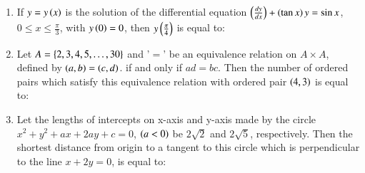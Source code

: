 \documentclass[journal,12pt,onecolumn]{IEEEtran}
\theoremstyle{remark}
\begin{document}
\begin{enumerate}
\hfill{}
\begin{enumerate}
\end{enumerate}

\item If $y=y\left(x\right)$ is the solution of the differential equation $\left(\frac{dy}{dx}\right)+\left(\tan x\right)y=\sin x$, $0\leq x\leq \frac{\pi}{3}$, with $y\left(0\right)=0$, then $y\left(\frac{\pi}{4}\right)$ is equal to:

\hfill{}
\begin{enumerate}
\end{enumerate}

\item Let $A=\left\{2,3,4,5,\dots,30\right\}$ and '$=$' be an equivalence relation on $A \times A$, defined by $\left(a,b\right)=\left(c,d\right)$. if and only if $ad=bc$. Then the number of ordered pairs which satisfy this equivalence relation with ordered pair $\left(4,3\right)$ is equal to:

\hfill{}
\begin{enumerate}
\end{enumerate}

\item Let the lengths of intercepts on x-axis and y-axis made by the circle $x^2+y^2+ax+2ay+c=0$, $\left(a<0\right)$ be $2\sqrt{2}$ and $2\sqrt{5}$, respectively. Then the shortest distance from origin to a tangent to this circle which is perpendicular to the line $x+2y=0$, is equal to:


\end{enumerate}
\end{document}
